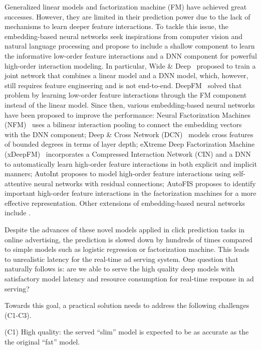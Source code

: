 \documentclass[sigconf]{acmart}
\begin{document}
Generalized linear models and factorization machine (FM) \citep{FM} have achieved great successes. However, they are limited in their prediction power due to the lack of mechanisms to learn deeper feature interactions. To tackle this issue, the embedding-based neural networks seek inspirations from computer vision and natural language processing and propose to include a shallow component to learn the informative low-order feature interactions and a DNN component for powerful high-order interaction modeling. In particular, Wide \& Deep~\cite{deepwide} proposed to train a joint network that combines a linear model and a DNN model, which, however, still requires feature engineering and is not end-to-end. DeepFM~\cite{deepfm} solved that problem by learning low-order feature interactions through the FM component instead of the linear model. Since then, various embedding-based neural networks have been proposed to improve the performance: Neural Factorization Machines (NFM)~\cite{NFM} uses a bilinear interaction pooling to connect the embedding vectors with the DNN component; Deep \& Cross Network (DCN)~\cite{deepcross} models cross features of bounded degrees in terms of layer depth; eXtreme Deep Factorization Machine (xDeepFM)~\cite{xdeepfm} incorporates a Compressed Interaction Network (CIN) \cite{deepcross} and a DNN to automatically learn high-order feature interactions in both explicit and implicit manners; AutoInt \cite{autoint} proposes to model high-order feature interactions using self-attentive neural networks with residual connections; AutoFIS \cite{autofis} proposes to identify important high-order feature interactions in the factorization machines for a more effective representation. Other extensions of embedding-based neural networks include \cite{PNN, deepcrossing, FLEN20, DIN}.


Despite the advances of these novel models applied in click prediction tasks in online advertising, the prediction is slowed down by hundreds of times compared to simple models such as logistic regression or factorization machine. This leads to unrealistic latency for the real-time ad serving system. One question that naturally follows is: are we able to serve the  high quality deep models with satisfactory model latency and resource consumption for real-time response in ad serving? 

Towards this goal, a practical solution needs to address
the following challenges (C1-C3). 

(C1) High quality: the served ``slim''
model is expected to be as accurate as the the original ``fat'' model.  
\end{document}

